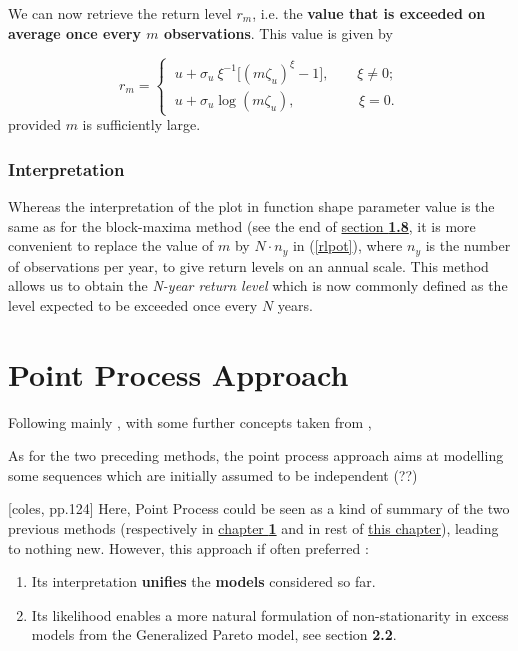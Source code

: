 \documentclass[11pt,a4paper,openany ]{book}
\begin{document}
We can now retrieve the return level $r_m$, i.e. the\textbf{ value that is exceeded on average once every $m$ observations}. 
This value is given by 

\begin{equation}\label{rlpot}
r_m=\begin{cases}
\ u+\sigma_u\ \xi^{-1}\Big[(m\zeta_u)^{\xi}-1\Big], \ \ \ \ \ \ \ \  \ \xi\neq 0;\\
\ u +\sigma_u \log(m\zeta_u), \ \ \ \ \ \ \ \ \  \ \ \ \ \ \ \quad \ \xi =0.
\end{cases}
\end{equation}
provided $m$ is sufficiently large.

\subsubsection*{Interpretation}

Whereas the interpretation of the plot in function shape parameter value is the same as for the block-maxima method  (see the end of \hyperref[rlplot]{section \textbf{1.8}}, it is more convenient to replace the value of $m$ by $N\cdot n_y$ in (\ref{rlpot}), where $n_y$ is the number of observations per year, to give return levels on an annual scale. This method allows us to obtain the\emph{ N-year return level} which is now commonly defined as the level expected to be exceeded once every $N$ years.


\section{Point Process Approach}\label{poissonproc}
Following mainly \cite{coles_introduction_2001}, with some further concepts taken from \cite{embrechts_modelling_1997} , 

As for the two preceding methods, the point process approach aims at modelling some sequences which are initially assumed to be independent (??)

[coles, pp.124] Here, Point Process could be seen as a kind of summary of the two previous methods (respectively in \hyperref[sec::1]{chapter \textbf{1}} and in rest of \hyperref[sec::2]{this chapter}), leading to nothing new. However, this approach if often preferred : %
\begin{enumerate}
	\item Its interpretation \textbf{unifies} the \textbf{models} considered so far.
	\item Its likelihood enables a more natural formulation of non-stationarity in excess models from the Generalized Pareto model, see section \textbf{2.2}.
\end{enumerate}
\end{document}
